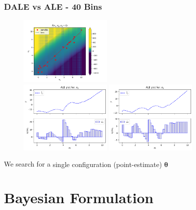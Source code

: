 \documentclass{beamer}
\newcommand{\thetab}{\boldsymbol{\theta}}
\begin{document}
\begin{frame}
  \frametitle{DALE vs ALE - 40 Bins}
  \begin{figure}[ht]
    \centering
    \includegraphics[width=0.4\textwidth]{./figures/bin_splitting_40_bins.png}\\
    \includegraphics[width=0.4\textwidth]{./figures/dale_40_bins.png}
    \includegraphics[width=0.4\textwidth]{./figures/ale_40_bins.png}
    \label{}
  \end{figure}
  \noindent\makebox[\linewidth]{\rule{\paperwidth}{0.4pt}}
  We search for a \alert{single configuration (point-estimate) \( \hat{\thetab}\) }
\end{frame}



\section{Bayesian Formulation}
\end{document}
